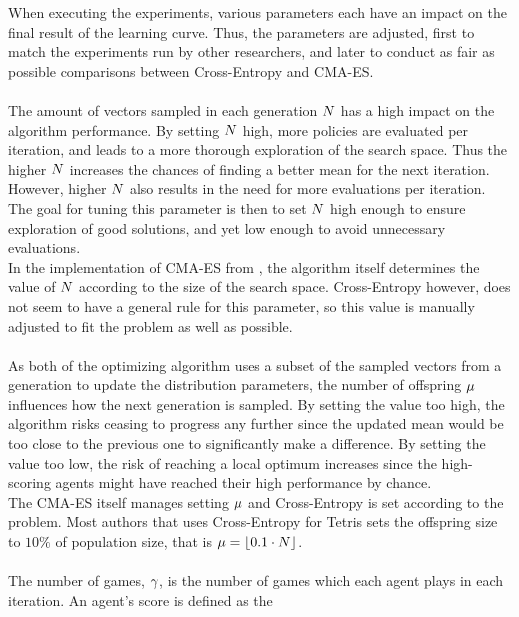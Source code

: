 When executing the experiments, various parameters each have 
an impact on the final result of the learning curve. Thus, the parameters
are adjusted, first to match the experiments run by other researchers, 
and later to conduct as fair as possible comparisons between 
Cross-Entropy and CMA-ES.\\
\\
The amount of vectors sampled in each generation $N$
has a high impact on the algorithm performance. By setting $N$
high, more policies are evaluated per iteration, and leads to a more thorough 
exploration of the search space. Thus the higher $N$ increases the
chances of finding a better mean for the next iteration.
However, higher $N$ also results in the
need for more evaluations per iteration. The goal for 
tuning this parameter is then
to set $N$ high enough to ensure 
exploration of good solutions, and yet 
low enough to avoid unnecessary evaluations.\\
In the implementation of CMA-ES from \shark , 
the algorithm  itself determines
the value of $N$ according to the 
size of the search space. 
Cross-Entropy however, does not seem to have a 
general rule for this parameter,
so this value is manually adjusted to fit the 
problem as well as possible.\\
\\
As both of the optimizing algorithm uses a subset of the sampled vectors
from a generation to update the distribution parameters, the number of 
offspring $\mu$ influences how the next generation is sampled.
By setting the value too high, the algorithm risks ceasing to progress any 
further since the updated mean would be too close to the previous one to 
significantly make a difference. By setting the value too low,
the risk of reaching a local optimum increases since the high-scoring agents
might have reached their high performance by chance.\\
The CMA-ES itself manages setting $\mu$ and Cross-Entropy
is set according to the problem. Most authors that uses Cross-Entropy for Tetris
sets the offspring size to $10\%$ of population size, that is 
$\mu = \lfloor 0.1 \cdot N \rfloor $.\\
\\
The number of games, $\gamma$, 
is the number of games  which each agent 
plays in each iteration. An agent's score is defined as the 
